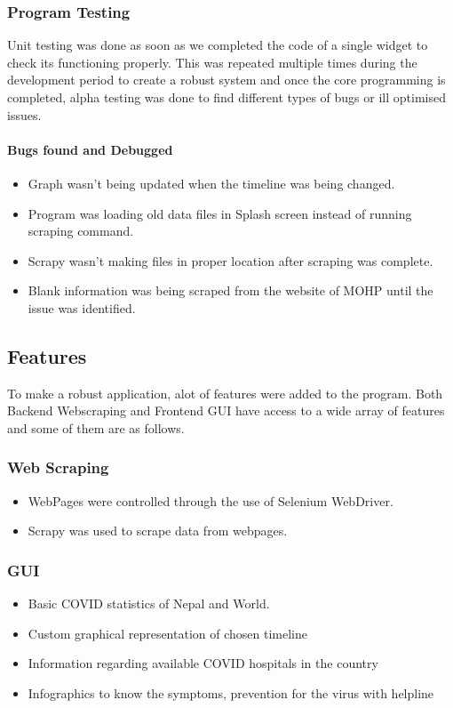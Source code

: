 \documentclass[12pt]{article}
\begin{document}
\subsubsection{Program Testing}
Unit testing was done as soon as we completed the code of a single widget to check its functioning properly. This was repeated multiple times during the development 
period to create a robust system and once the core programming is completed, alpha testing was done to find different types of bugs or ill optimised issues.
\paragraph{Bugs found and Debugged}
\begin{itemize}
    \item Graph wasn't being updated when the timeline was being changed.
    \item Program was loading old data files in Splash screen instead of running scraping command.
    \item Scrapy wasn't making files in proper location after scraping was complete.
    \item Blank information was being scraped from the website of MOHP until the issue was identified.
\end{itemize}
\clearpage
\subsection{Features}
To make a robust application, alot of features were added to the program. Both Backend Webscraping and Frontend GUI have access to a wide array of features and 
some of them are as follows.

\subsubsection{Web Scraping}
\begin{itemize}
    \item WebPages were controlled through the use of Selenium WebDriver.
    \item Scrapy was used to scrape data from webpages.
\end{itemize}
\subsubsection{GUI}
\begin{itemize}
    \item Basic COVID statistics of Nepal and World.
    \item Custom graphical representation of chosen timeline
    \item Information regarding available COVID hospitals in the country
    \item Infographics to know the symptoms, prevention for the virus with helpline
\end{itemize}
\end{document}
